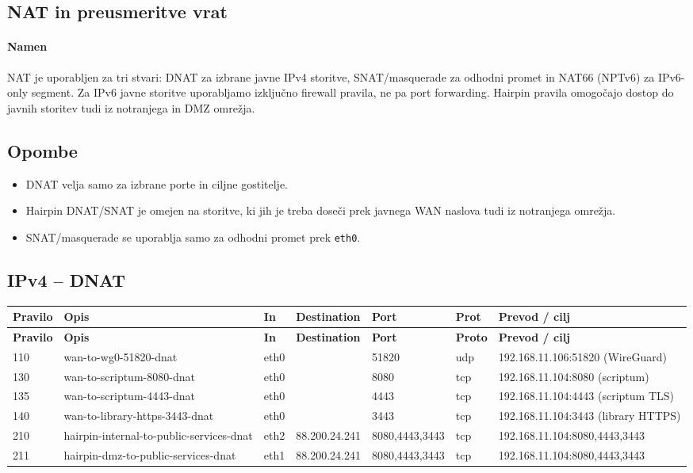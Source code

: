 \documentclass[a4paper,11pt]{article}
\begin{document}
\begin{landscape}

\section{NAT in preusmeritve vrat}

\paragraph{Namen}
NAT je uporabljen za tri stvari: DNAT za izbrane javne IPv4 storitve, SNAT/masquerade za odhodni promet in NAT66 (NPTv6) za IPv6-only segment. Za IPv6 javne storitve uporabljamo izključno firewall pravila, ne pa port forwarding. Hairpin pravila omogočajo dostop do javnih storitev tudi iz notranjega in DMZ omrežja.

\subsection{Opombe}
\begin{itemize}
  \item DNAT velja samo za izbrane porte in ciljne gostitelje.
  \item Hairpin DNAT/SNAT je omejen na storitve, ki jih je treba doseči prek javnega WAN naslova tudi iz notranjega omrežja.
  \item SNAT/masquerade se uporablja samo za odhodni promet prek \texttt{eth0}.
\end{itemize}

\subsection{IPv4 -- DNAT}
\begin{longtable}{|l|l|l|l|p{2.4cm}|l|l|}
\hline
\textbf{Pravilo} & \textbf{Opis} & \textbf{In} & \textbf{Destination} & \textbf{Port} & \textbf{Prot} & \textbf{Prevod / cilj} \\
\hline
\endfirsthead
\hline
\textbf{Pravilo} & \textbf{Opis} & \textbf{In} & \textbf{Destination} & \textbf{Port} & \textbf{Proto} & \textbf{Prevod / cilj} \\
\hline
\endhead
110 & wan-to-wg0-51820-dnat & eth0 & & 51820 & udp & 192.168.11.106:51820 (WireGuard) \\
130 & wan-to-scriptum-8080-dnat & eth0 & & 8080 & tcp & 192.168.11.104:8080 (scriptum) \\
135 & wan-to-scriptum-4443-dnat & eth0 & & 4443 & tcp & 192.168.11.104:4443 (scriptum TLS) \\
140 & wan-to-library-https-3443-dnat & eth0 & & 3443 & tcp & 192.168.11.104:3443 (library HTTPS) \\
210 & hairpin-internal-to-public-services-dnat & eth2 & 88.200.24.241 & 8080,4443,3443 & tcp & 192.168.11.104:8080,4443,3443 \\
211 & hairpin-dmz-to-public-services-dnat & eth1 & 88.200.24.241 & 8080,4443,3443 & tcp & 192.168.11.104:8080,4443,3443 \\
\hline
\end{longtable}


\end{landscape}
\end{document}
